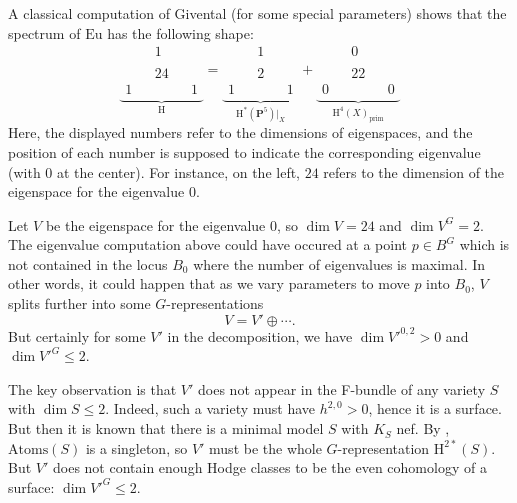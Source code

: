 \documentclass[11pt, reqno]{amsart}
\numberwithin{equation}{section}
\theoremstyle{plain}
\theoremstyle{definition}
\theoremstyle{italicsname}
\newcommand{\prim}{\mathrm{prim}}
\newcommand{\Atoms}{\mathrm{Atoms}}
\newcommand{\rH}{\mathrm{H}}
\newcommand{\bP}{\mathbf{P}}
\newcommand{\euler}{\mathrm{Eu}}
\begin{document}
A classical computation of Givental (for some special parameters) shows that the spectrum of $\euler$ has the following shape:
\begin{equation*}
    \underbrace{\begin{array}{ccccccc}
        & & 1 & \\
        \\
        & & 24 \\
        1 & & & & 1
    \end{array}}_{\rH} =  \underbrace{\begin{array}{ccccccc}
        & & 1 & \\
        \\
        & & 2 \\
        1 & & & & 1
    \end{array}}_{\rH^*(\bP^5)|_{X}} + \underbrace{\begin{array}{ccccccc}
        & & 0 & \\
        \\
        & & 22 \\
        0 & & & & 0
    \end{array}}_{\rH^4(X)_{\prim}}
\end{equation*}
Here, the displayed numbers refer to the dimensions of eigenspaces, and the position of each number is supposed to indicate the corresponding eigenvalue (with $0$ at the center). For instance, on the left, $24$ refers to the dimension of the eigenspace for the eigenvalue $0$.

Let $V$ be the eigenspace for the eigenvalue $0$, so $\dim V = 24$ and $\dim V^G = 2$. The eigenvalue computation above could have occured at a point $p \in B^G$ which is not contained in the locus $B_0$ where the number of eigenvalues is maximal. In other words, it could happen that as we vary parameters to move $p$ into $B_0$, $V$ splits further into some $G$-representations 
\[
    V = V' \oplus \cdots.
\]
But certainly for some $V'$ in the decomposition, we have $\dim V'^{0,2} > 0$ and $\dim V'^G \leq 2$. 



The key observation is that $V'$ does not appear in the F-bundle of any variety $S$ with $\dim S \leq 2$. Indeed, such a variety must have $h^{2, 0} > 0$, hence it is a surface. But then it is known that there is a minimal model $S$ with $K_S$ nef. By , $\Atoms(S)$ is a singleton, so $V'$ must be the whole $G$-representation $\rH^{2*}(S)$. But $V'$ does not contain enough Hodge classes to be the even cohomology of a surface: $\dim V'^G \leq 2$.
\end{document}
